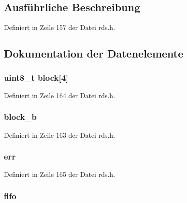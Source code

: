 \subsection{Ausführliche Beschreibung}


Definiert in Zeile 157 der Datei rds.\+h.



\subsection{Dokumentation der Datenelemente}
\hypertarget{structrds_af966591bcdc65611d3f9ec47cd36d52a}{}
\subsubsection[{block}]{\setlength{\rightskip}{0pt plus 5cm}uint8\+\_\+t block\mbox{[}4\mbox{]}}\label{structrds_af966591bcdc65611d3f9ec47cd36d52a}


Definiert in Zeile 164 der Datei rds.\+h.

\hypertarget{structrds_ad8c59b1a87492b568b0bf85aef6f5f87}{}
\subsubsection[{block\+\_\+b}]{ {\bf block\+\_\+b}}\label{structrds_ad8c59b1a87492b568b0bf85aef6f5f87}


Definiert in Zeile 163 der Datei rds.\+h.

\hypertarget{structrds_a533130a85d028e42078891666dd6c6fc}{}
\subsubsection[{err}]{ {\bf err}}\label{structrds_a533130a85d028e42078891666dd6c6fc}


Definiert in Zeile 165 der Datei rds.\+h.

\hypertarget{structrds_a7f4b3988a39d63bbb74e44a08285d9ef}{}
\subsubsection[{fifo}]{ {\bf fifo}}\label{structrds_a7f4b3988a39d63bbb74e44a08285d9ef}



